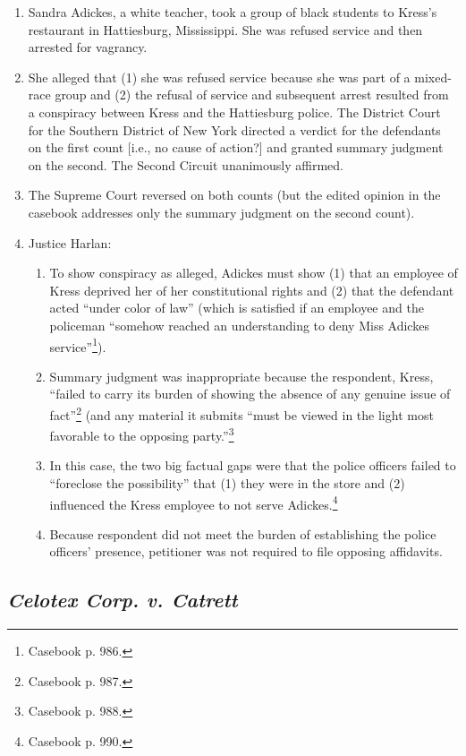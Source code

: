 \begin{enumerate}
    \item Sandra Adickes, a white teacher, took a group of black students to Kress's restaurant in Hattiesburg, Mississippi. She was refused service and then arrested for vagrancy.
    \item She alleged that (1) she was refused service because she was part of a mixed-race group and (2) the refusal of service and subsequent arrest resulted from a conspiracy between Kress and the Hattiesburg police. The District Court for the Southern District of New York directed a verdict for the defendants on the first count [i.e., no cause of action?] and granted summary judgment on the second. The Second Circuit unanimously affirmed.
    \item The Supreme Court reversed on both counts (but the edited opinion in the casebook addresses only the summary judgment on the second count).
    \item Justice Harlan:
    \begin{enumerate}
        \item To show conspiracy as alleged, Adickes must show (1) that an employee of Kress deprived her of her constitutional rights and (2) that the defendant acted ``under color of law'' (which is satisfied if an employee and the policeman ``somehow reached an understanding to deny Miss Adickes service''\footnote{Casebook p. 986.}).
        \item Summary judgment was inappropriate because the respondent, Kress, ``failed to carry its burden of showing the absence of any genuine issue of fact''\footnote{Casebook p. 987.} (and any material it submits ``must be viewed in the light most favorable to the opposing party.''\footnote{Casebook p. 988.}
        \item In this case, the two big factual gaps were that the police officers failed to ``foreclose the possibility'' that (1) they were in the store and (2) influenced the Kress employee to not serve Adickes.\footnote{Casebook p. 990.}
        \item Because respondent did not meet the burden of establishing the police officers' presence, petitioner was not required to file opposing affidavits.
    \end{enumerate}
\end{enumerate}

\subsection{\emph{Celotex Corp. v. Catrett}}

